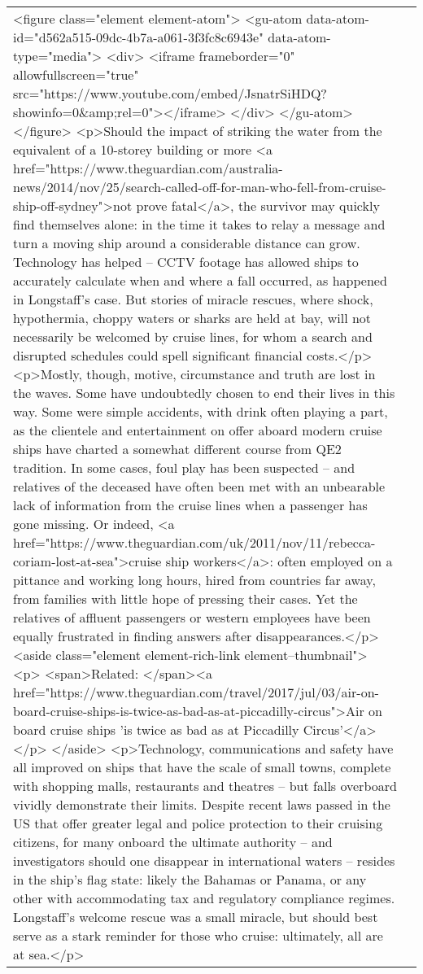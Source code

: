 \documentclass[]{article}
\begin{document}
\begin{table}[!h]
{\begin{tabular}[t]{ll}
<figure class="element element-atom"> 
 <gu-atom data-atom-id="d562a515-09dc-4b7a-a061-3f3fc8c6943e" data-atom-type="media"> 
  <div>
   <iframe frameborder="0" allowfullscreen="true" src="https://www.youtube.com/embed/JsnatrSiHDQ?showinfo=0\&amp;rel=0"></iframe>
  </div>
 </gu-atom> 
</figure> 
<p>Should the impact of striking the water from the equivalent of a 10-storey building or more <a href="https://www.theguardian.com/australia-news/2014/nov/25/search-called-off-for-man-who-fell-from-cruise-ship-off-sydney">not prove fatal</a>, the survivor may quickly find themselves alone: in the time it takes to relay a message and turn a moving ship around a considerable distance can grow. Technology has helped – CCTV footage has allowed ships to accurately calculate when and where a fall occurred, as happened in Longstaff’s case. But stories of miracle rescues, where shock, hypothermia, choppy waters or sharks are held at bay, will not necessarily be welcomed by cruise lines, for whom a search and disrupted schedules could spell significant financial costs.</p> 
<p>Mostly, though, motive, circumstance and truth are lost in the waves. Some have undoubtedly chosen to end their lives in this way. Some were simple accidents, with drink often playing a part, as the clientele and entertainment on offer aboard modern cruise ships have charted a somewhat different course from QE2 tradition. In some cases, foul play has been suspected – and relatives of the deceased have often been met with an unbearable lack of information from the cruise lines when a passenger has gone missing. Or indeed, <a href="https://www.theguardian.com/uk/2011/nov/11/rebecca-coriam-lost-at-sea">cruise ship workers</a>: often employed on a pittance and working long hours, hired from countries far away, from families with little hope of pressing their cases. Yet the relatives of affluent passengers or western employees have been equally frustrated in finding answers after disappearances.</p> 
<aside class="element element-rich-link element--thumbnail"> 
 <p> <span>Related: </span><a href="https://www.theguardian.com/travel/2017/jul/03/air-on-board-cruise-ships-is-twice-as-bad-as-at-piccadilly-circus">Air on board cruise ships 'is twice as bad as at Piccadilly Circus'</a> </p> 
</aside> 
<p>Technology, communications and safety have all improved on ships that have the scale of small towns, complete with shopping malls, restaurants and theatres – but falls overboard vividly demonstrate their limits. Despite recent laws passed in the US that offer greater legal and police protection to their cruising citizens, for many onboard the ultimate authority – and investigators should one disappear in international waters – resides in the ship’s flag state: likely the Bahamas or Panama, or any other with accommodating tax and regulatory compliance regimes. Longstaff’s welcome rescue was a small miracle, but should best serve as a stark reminder for those who cruise: ultimately, all are at sea.</p> 

\end{tabular}}
\end{table}
\end{document}
